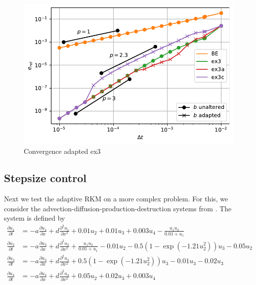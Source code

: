 \documentclass[a4paper]{article}
\numberwithin{equation}{section}
\theoremstyle{plain}
\theoremstyle{definition}
\numberwithin{theorem}{section}
\newcommand{\1}{\mathbbm{1}}
\begin{document}
\begin{figure}[ht]
\centering
\includegraphics[scale=0.75]{plots/conv_heat.pdf}
\caption{Convergence adapted ex3}
\label{fig:conv_impl}
\end{figure}


\subsection{Stepsize control}

Next we test the adaptive RKM on a more complex problem. 
For this, we consider the advection-diffusion-production-destruction systems from \cite{kopecz_comparison_2019}. The system is defined by
\begin{subequations}
\label{eq:ADR}
\begin{align}
\frac{\partial u_1}{\partial t} &=-a \frac{\partial u_1}{\partial x} + d\frac{\partial^2 u_1}{\partial x ^2} + 0.01u_2 + 0.01 u_3 +0.003u_4 - \frac{u_1 u_2}{0.01+u_1} \\ 
\frac{\partial u_2}{\partial t} &=-a \frac{\partial u_2}{\partial x} + d\frac{\partial^2 u_2}{\partial x ^2} + \frac{u_1u_2}{0.01+u_1} -0.01 u_2-0.5(1-\exp(-1.21 u_2^2)) u_3 -0.05 u_2 \\ 
\frac{\partial u_3}{\partial t} &=-a \frac{\partial u_3}{\partial x} + d\frac{\partial^2 u_3}{\partial x ^2} + 0.5(1-\exp(-1.21u_2^2)) u_3 - 0.01 u_3 -0.02 u_3 \\ 
\frac{\partial u_4}{\partial t} &=-a \frac{\partial u_4}{\partial x} + d\frac{\partial^2 u_4}{\partial x ^2} + 0.05 u_2 + 0.02 u_3 + 0.003u_4 
\end{align}
\end{subequations}
\end{document}
